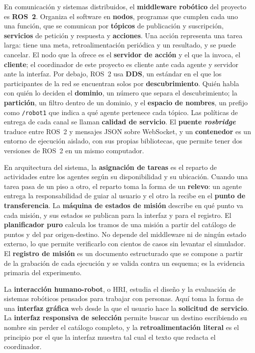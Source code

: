En comunicación y sistemas distribuidos, el \textbf{middleware robótico} del
proyecto es \textbf{ROS~2}. Organiza el software en \textbf{nodos}, programas que
cumplen cada uno una función, que se comunican por \textbf{tópicos} de
publicación y suscripción, \textbf{servicios} de petición y respuesta y
\textbf{acciones}. Una acción representa una tarea larga: tiene una meta,
retroalimentación periódica y un resultado, y se puede cancelar. El nodo que la
ofrece es el \textbf{servidor de acción} y el que la invoca, el
\textbf{cliente}; el coordinador de este proyecto es cliente ante cada agente y
servidor ante la interfaz. Por debajo, ROS~2 usa \textbf{DDS}, un estándar en el
que los participantes de la red se encuentran solos por \textbf{descubrimiento}.
Quién habla con quién lo deciden el \textbf{dominio}, un número que separa el
descubrimiento; la \textbf{partición}, un filtro dentro de un dominio, y el
\textbf{espacio de nombres}, un prefijo como \texttt{/robot1} que indica a qué
agente pertenece cada tópico. Las políticas de entrega de cada canal se llaman
\textbf{calidad de servicio}. El \textbf{puente \textit{rosbridge}} traduce entre
ROS~2 y mensajes JSON sobre WebSocket, y un \textbf{contenedor} es un entorno de
ejecución aislado, con sus propias bibliotecas, que permite tener dos versiones
de ROS~2 en un mismo computador.

En arquitectura del sistema, la \textbf{asignación de tareas} es el reparto de
actividades entre los agentes según su disponibilidad y su ubicación. Cuando una
tarea pasa de un piso a otro, el reparto toma la forma de un
\textbf{relevo}: un agente entrega la responsabilidad de guiar al usuario y el
otro la recibe en el \textbf{punto de transferencia}. La \textbf{máquina de
estados de misión} describe en qué punto va cada misión, y sus estados se
publican para la interfaz y para el registro. El \textbf{planificador puro}
calcula los tramos de una misión a partir del catálogo de puntos y del par
origen-destino. No depende del middleware ni de ningún estado externo, lo que permite
verificarlo con cientos de casos sin levantar el simulador. El
\textbf{registro de misión} es un documento estructurado que se compone a partir
de la grabación de cada ejecución y se valida contra un esquema; es la evidencia
primaria del experimento.

La \textbf{interacción humano-robot}, o HRI, estudia el diseño y la evaluación de sistemas
robóticos pensados para trabajar con personas. Aquí toma la forma de una
\textbf{interfaz gráfica} web desde la que el usuario hace la \textbf{solicitud
de servicio}. La \textbf{interfaz responsiva de selección} permite buscar un
destino escribiendo su nombre sin perder el catálogo completo, y la
\textbf{retroalimentación literal} es el principio por el que la interfaz
muestra tal cual el texto que redacta el coordinador.

